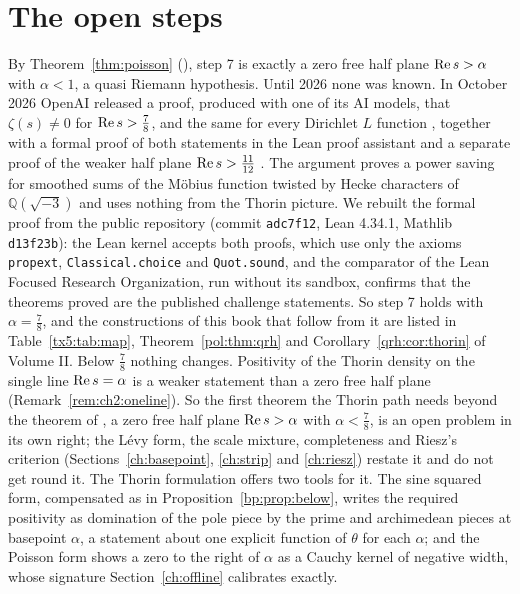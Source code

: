 \section{The open steps}\label{sec:ch25:open}

By Theorem~\ref{thm:poisson} (\cite[Theorem 3.7 and Remark 3.10]{P26}), step 7 is exactly a zero free half plane $\operatorname{Re} s>\alpha$ with $\alpha<1$, a quasi Riemann hypothesis. Until 2026 none was known. In October 2026 OpenAI released a proof, produced with one of its AI models, that $\zeta(s)\ne0$ for $\operatorname{Re} s>\frac78$, and the same for every Dirichlet $L$ function \cite{OAI26a}, together with a formal proof of both statements in the Lean proof assistant and a separate proof of the weaker half plane $\operatorname{Re} s>\frac{11}{12}$ \cite{OAI26b}. The argument proves a power saving for smoothed sums of the M\"obius function twisted by Hecke characters of $\mathbb Q(\sqrt{-3})$ and uses nothing from the Thorin picture. We rebuilt the formal proof from the public repository (commit \texttt{adc7f12}, Lean 4.34.1, Mathlib \texttt{d13f23b}): the Lean kernel accepts both proofs, which use only the axioms \texttt{propext}, \texttt{Classical.choice} and \texttt{Quot.sound}, and the comparator of the Lean Focused Research Organization, run without its sandbox, confirms that the theorems proved are the published challenge statements. So step 7 holds with $\alpha=\frac78$, and the constructions of this book that follow from it are listed in Table~\ref{tx5:tab:map}, Theorem~\ref{pol:thm:qrh} and Corollary~\ref{qrh:cor:thorin} of Volume II. Below $\frac78$ nothing changes. Positivity of the Thorin density on the single line $\operatorname{Re} s=\alpha$ is a weaker statement than a zero free half plane (Remark~\ref{rem:ch2:oneline}). So the first theorem the Thorin path needs beyond the theorem of \cite{OAI26a}, a zero free half plane $\operatorname{Re} s>\alpha$ with $\alpha<\frac78$, is an open problem in its own right; the L\'evy form, the scale mixture, completeness and Riesz's criterion (Sections~\ref{ch:basepoint}, \ref{ch:strip} and \ref{ch:riesz}) restate it and do not get round it. The Thorin formulation offers two tools for it. The sine squared form, compensated as in Proposition~\ref{bp:prop:below}, writes the required positivity as domination of the pole piece by the prime and archimedean pieces at basepoint $\alpha$, a statement about one explicit function of $\theta$ for each $\alpha$; and the Poisson form shows a zero to the right of $\alpha$ as a Cauchy kernel of negative width, whose signature Section~\ref{ch:offline} calibrates exactly.

